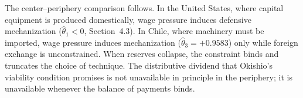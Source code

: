 The center--periphery comparison follows. In the United States, where
capital equipment is produced domestically, wage pressure induces defensive
mechanization ($\hat{\theta}_1 < 0$, Section~4.3). In Chile, where machinery
must be imported, wage pressure induces mechanization
($\hat{\theta}_3 = +0.9583$) only while foreign exchange is unconstrained.
When reserves collapse, the constraint binds and truncates the choice of
technique. The distributive dividend that Okishio's viability condition
promises is not unavailable in principle in the periphery; it is unavailable
whenever the balance of payments binds.